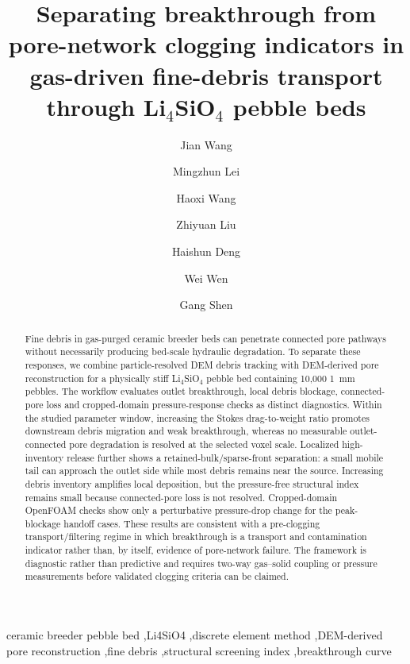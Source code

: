 \documentclass[preprint,12pt,authoryear]{elsarticle}
\newcommand{\LiSi}{Li$_4$SiO$_4$\xspace}
\begin{document}
\begin{frontmatter}

\title{\texorpdfstring{Separating breakthrough from pore-network clogging indicators in gas-driven fine-debris transport through \LiSi pebble beds}{Separating breakthrough from pore-network clogging indicators in gas-driven fine-debris transport through Li4SiO4 pebble beds}}

\author[aff1,aff2]{Jian Wang}
\author[aff2]{Mingzhun Lei}
\author[aff1]{Haoxi Wang}
\author[aff1]{Zhiyuan Liu}
\author[aff1]{Haishun Deng}
\author[aff1,aff2]{Wei Wen}
\author[aff1]{Gang Shen}


\address[aff1]{Anhui University of Science and Technology, Huainan, Anhui, China}
\address[aff2]{Institute of Plasma Physics, Hefei Institutes of Physical Science, Chinese Academy of Sciences, Hefei, Anhui, China}

\begin{abstract}
Fine debris in gas-purged ceramic breeder beds can penetrate connected pore pathways without necessarily producing bed-scale hydraulic degradation. To separate these responses, we combine particle-resolved DEM debris tracking with DEM-derived pore reconstruction for a physically stiff \LiSi pebble bed containing 10,000 \SI{1}{mm} pebbles. The workflow evaluates outlet breakthrough, local debris blockage, connected-pore loss and cropped-domain pressure-response checks as distinct diagnostics. Within the studied parameter window, increasing the Stokes drag-to-weight ratio promotes downstream debris migration and weak breakthrough, whereas no measurable outlet-connected pore degradation is resolved at the selected voxel scale. Localized high-inventory release further shows a retained-bulk/sparse-front separation: a small mobile tail can approach the outlet side while most debris remains near the source. Increasing debris inventory amplifies local deposition, but the pressure-free structural index remains small because connected-pore loss is not resolved. Cropped-domain OpenFOAM checks show only a perturbative pressure-drop change for the peak-blockage handoff cases. These results are consistent with a pre-clogging transport/filtering regime in which breakthrough is a transport and contamination indicator rather than, by itself, evidence of pore-network failure. The framework is diagnostic rather than predictive and requires two-way gas--solid coupling or pressure measurements before validated clogging criteria can be claimed.
\end{abstract}

\begin{keyword}
ceramic breeder pebble bed \sep Li4SiO4 \sep discrete element method \sep DEM-derived pore reconstruction \sep fine debris \sep structural screening index \sep breakthrough curve
\end{keyword}

\end{frontmatter}
\end{document}
